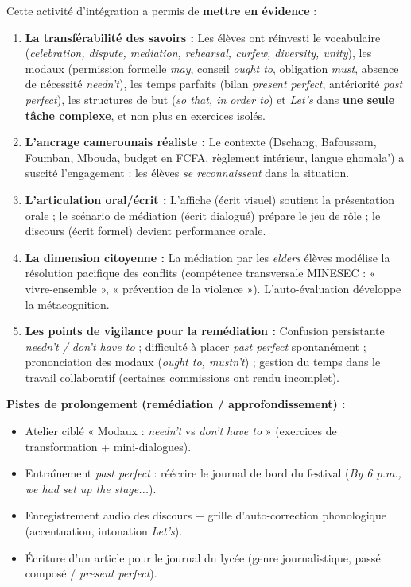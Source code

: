 \documentclass[11pt]{article}
\newcounter{popsec}
\newcounter{popsub}
\newcommand{\courssub}[1]{%
  \stepcounter{popsub}%
  \par\vspace{9pt}\noindent{\popxbold\fontsize{11.5}{13}\selectfont\color{popink}{\color{poporange}\thepopsec.\thepopsub}\hspace{6pt}#1}\par\nopagebreak\vspace{4pt}
}
\begin{document}
\courssub{Bilan de l'activité}
Cette activité d'intégration a permis de \textbf{mettre en évidence} :

\begin{enumerate}
    \item \textbf{La transférabilité des savoirs :} Les élèves ont réinvesti le vocabulaire (\emph{celebration, dispute, mediation, rehearsal, curfew, diversity, unity}), les modaux (permission formelle \emph{may}, conseil \emph{ought to}, obligation \emph{must}, absence de nécessité \emph{needn't}), les temps parfaits (bilan \emph{present perfect}, antériorité \emph{past perfect}), les structures de but (\emph{so that, in order to}) et \emph{Let's} dans \textbf{une seule tâche complexe}, et non plus en exercices isolés.
    \item \textbf{L'ancrage camerounais réaliste :} Le contexte (Dschang, Bafoussam, Foumban, Mbouda, budget en FCFA, règlement intérieur, langue ghomala') a suscité l'engagement : les élèves \emph{se reconnaissent} dans la situation.
    \item \textbf{L'articulation oral/écrit :} L'affiche (écrit visuel) soutient la présentation orale ; le scénario de médiation (écrit dialogué) prépare le jeu de rôle ; le discours (écrit formel) devient performance orale.
    \item \textbf{La dimension citoyenne :} La médiation par les \emph{elders} élèves modélise la résolution pacifique des conflits (compétence transversale MINESEC : « vivre-ensemble », « prévention de la violence »). L'auto-évaluation développe la métacognition.
    \item \textbf{Les points de vigilance pour la remédiation :} Confusion persistante \emph{needn't / don't have to} ; difficulté à placer \emph{past perfect} spontanément ; prononciation des modaux (\emph{ought to, mustn't}) ; gestion du temps dans le travail collaboratif (certaines commissions ont rendu incomplet).
\end{enumerate}

\textbf{Pistes de prolongement (remédiation / approfondissement) :}
\begin{itemize}
    \item Atelier ciblé « Modaux : \emph{needn't} vs \emph{don't have to} » (exercices de transformation + mini-dialogues).
    \item Entraînement \emph{past perfect} : réécrire le journal de bord du festival (\emph{By 6 p.m., we had set up the stage...}).
    \item Enregistrement audio des discours + grille d'auto-correction phonologique (accentuation, intonation \emph{Let's}).
    \item Écriture d'un article pour le journal du lycée (genre journalistique, passé composé / \emph{present perfect}).
\end{itemize}
\end{document}
